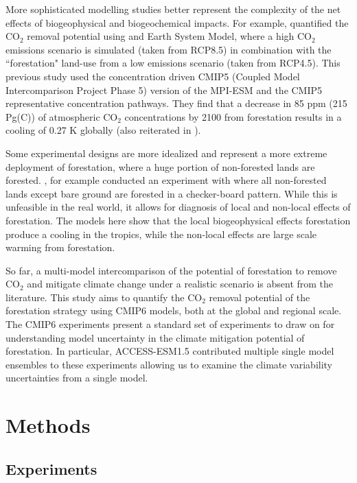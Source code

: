 \documentclass[]{article}
\begin{document}
More sophisticated modelling studies better represent the complexity of the net effects of biogeophysical and biogeochemical impacts.
For example, \cite{sonntag_reforestation_2016} quantified the CO$_2$ removal potential using and Earth System Model, where a high CO$_2$ emissions scenario is simulated (taken from RCP8.5) in combination with the ``forestation" land-use from a low emissions scenario (taken from RCP4.5).
This previous study used the concentration driven CMIP5 (Coupled Model Intercomparison Project Phase 5) version of the MPI-ESM and the CMIP5 representative concentration pathways.
They find that a decrease in 85 ppm (215 Pg(C)) of atmospheric CO$_2$ concentrations by 2100 from forestation results in a cooling of 0.27 K globally (also reiterated in \cite{sonntag_quantifying_2018}).

Some experimental designs are more idealized and represent a more extreme deployment of forestation, where a huge portion of non-forested lands are forested.
\cite{de_hertog_biogeophysical_2022}, for example conducted an experiment with where all non-forested lands except bare ground are forested in a checker-board pattern.
While this is unfeasible in the real world, it allows for diagnosis of local and non-local effects of forestation.
The models here show that the local biogeophysical effects forestation produce a cooling in the tropics, while the non-local effects are large scale warming from forestation. 

So far, a multi-model intercomparison of the potential of forestation to remove CO$_2$ and mitigate climate change under a realistic scenario is absent from the literature.
This study aims to quantify the CO$_2$ removal potential of the forestation strategy using CMIP6 models, both at the global and regional scale.
The CMIP6 experiments present a standard set of experiments to draw on for understanding model uncertainty in the climate mitigation potential of forestation.
In particular, ACCESS-ESM1.5 contributed multiple single model ensembles to these experiments allowing us to examine the climate variability uncertainties from a single model.

\section{Methods}

\subsection{Experiments}
\end{document}
